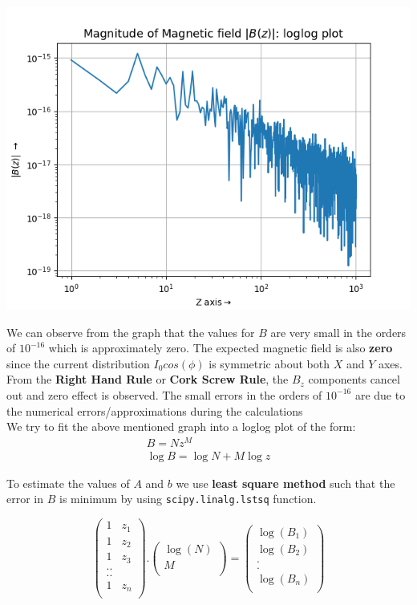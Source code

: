\documentclass[12pt, a4paper]{report}
\begin{document}
\begin{center}
	\includegraphics[scale=0.75]{Figure_2.png} 
	\label{fig:rawdata}
\end{center}

We can observe from the graph that the values for $B$ are very small in the orders of $10^{-16}$ which is approximately zero. The expected magnetic field is also \textbf{zero} since the current distribution $I_0cos(\phi)$ is symmetric about both $X$ and $Y$ axes. From the \textbf{Right Hand Rule} or \textbf{Cork Screw Rule}, the $B_z$ components cancel out and zero effect is observed. The small errors in the orders of $10^{-16}$ are due to the numerical errors/approximations during the calculations
\\

We try to fit the above mentioned graph into a loglog plot of the form:
\begin{align*}
B = Nz^{M} \\
\log B = \log N + M\log z
\end{align*}

\clearpage
 To estimate the values of $A$ and $b$ we use \textbf{least square method} such that the error in $B$ is minimum by using \texttt{scipy.linalg.lstsq} function. 

\begin{equation*}
\begin{pmatrix}
1 & z_1\\
1 & z_2\\
1 & z_3\\
.  .\\
.  .\\
1 & z_n\\
\end{pmatrix}
.
\begin{pmatrix}
\log(N)\\
M\\
\end{pmatrix}
=
\begin{pmatrix}
\log(B_1)\\
\log(B_2)\\
.\\
.\\
\log(B_n)\\
\end{pmatrix}
\end{equation*}
\end{document}
